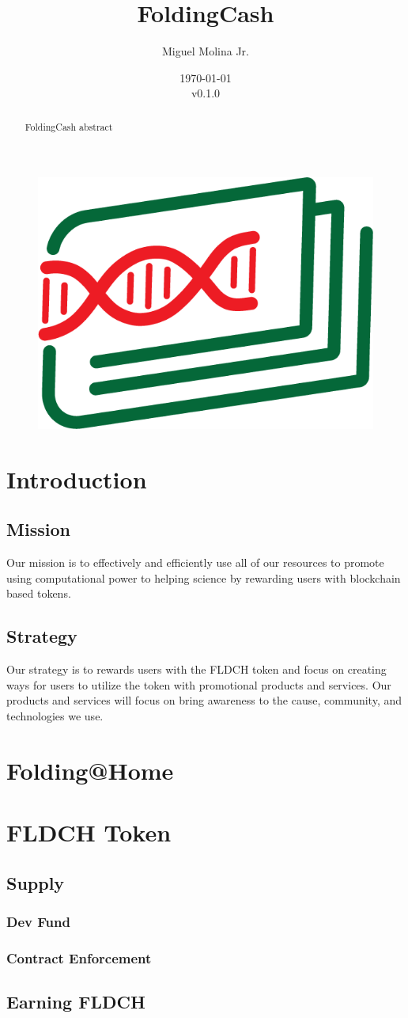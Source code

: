 \documentclass[letterpaper,12pt,titlepage]{article}
\title{FoldingCash}
\author{Miguel Molina Jr.}
\date{\today\\v0.1.0}
\def\token{FLDCH}
\begin{document}
\begin{figure}
    \centering
    \includegraphics[width=0.5\linewidth]{FoldingCash_Logo.png}
\end{figure}
\maketitle

\begin{abstract}
    FoldingCash abstract
\end{abstract}

\section{Introduction}

\subsection{Mission}
Our mission is to effectively and efficiently use all of our resources to promote using computational power to helping science by rewarding users with blockchain based tokens.

\subsection{Strategy}
Our strategy is to rewards users with the \token{} token and focus on creating ways for users to utilize the token with promotional products and services. Our products and services will focus on bring awareness to the cause, community, and technologies we use.

\section{Folding@Home}

\section{\token{} Token}

\subsection{Supply}

\subsubsection{Dev Fund}

\subsubsection{Contract Enforcement}

\subsection{Earning \token{}}
\end{document}
